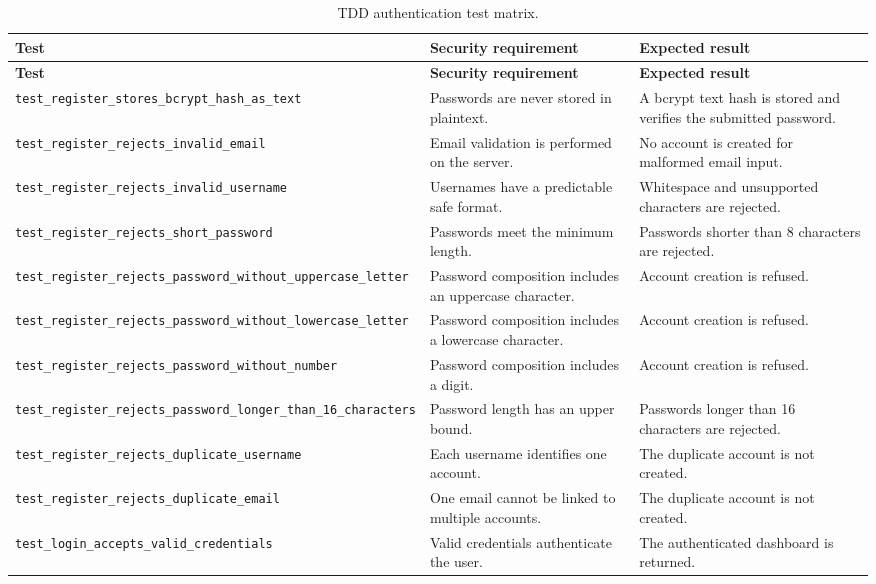 \documentclass[11pt,a4paper]{article}
\begin{document}
\small
\begin{longtable}{@{}p{}p{}p{}@{}}
\caption{TDD authentication test matrix.}\label{tab:tests}\\
\toprule
\textbf{Test} & \textbf{Security requirement} & \textbf{Expected result} \\
\midrule
\endfirsthead
\toprule
\textbf{Test} & \textbf{Security requirement} & \textbf{Expected result} \\
\midrule
\endhead
\texttt{test\_register\_stores\_bcrypt\_hash\_as\_text} & Passwords are never
stored in plaintext. & A bcrypt text hash is stored and verifies the submitted
password. \\
\texttt{test\_register\_rejects\_invalid\_email} & Email validation is performed
on the server. & No account is created for malformed email input. \\
\texttt{test\_register\_rejects\_invalid\_username} & Usernames have a predictable
safe format. & Whitespace and unsupported characters are rejected. \\
\texttt{test\_register\_rejects\_short\_password} & Passwords meet the minimum
length. & Passwords shorter than 8 characters are rejected. \\
\texttt{test\_register\_rejects\_password\_without\_uppercase\_letter} & Password
composition includes an uppercase character. & Account creation is refused. \\
\texttt{test\_register\_rejects\_password\_without\_lowercase\_letter} & Password
composition includes a lowercase character. & Account creation is refused. \\
\texttt{test\_register\_rejects\_password\_without\_number} & Password composition
includes a digit. & Account creation is refused. \\
\texttt{test\_register\_rejects\_password\_longer\_than\_16\_characters} & Password
length has an upper bound. & Passwords longer than 16 characters are rejected. \\
\texttt{test\_register\_rejects\_duplicate\_username} & Each username identifies
one account. & The duplicate account is not created. \\
\texttt{test\_register\_rejects\_duplicate\_email} & One email cannot be linked
to multiple accounts. & The duplicate account is not created. \\
\texttt{test\_login\_accepts\_valid\_credentials} & Valid credentials authenticate
the user. & The authenticated dashboard is returned. \\

\end{longtable}
\end{document}
